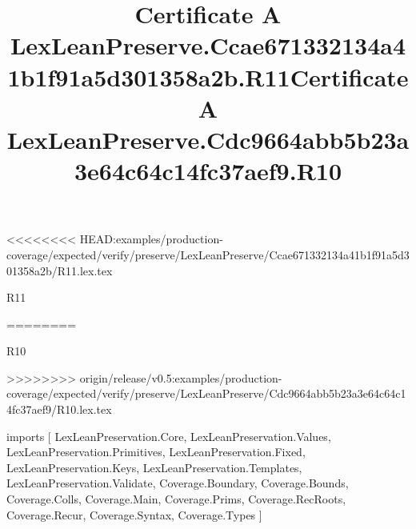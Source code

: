 <<<<<<<< HEAD:examples/production-coverage/expected/verify/preserve/LexLeanPreserve/Ccae671332134a41b1f91a5d301358a2b/R11.lex.tex
\begin{lexlean}{R11}
\title{Certificate A LexLeanPreserve.Ccae671332134a41b1f91a5d301358a2b.R11}
========
\begin{lexlean}{R10}
\title{Certificate A LexLeanPreserve.Cdc9664abb5b23a3e64c64c14fc37aef9.R10}
>>>>>>>> origin/release/v0.5:examples/production-coverage/expected/verify/preserve/LexLeanPreserve/Cdc9664abb5b23a3e64c64c14fc37aef9/R10.lex.tex
\begin{coremodule}
imports [
  LexLeanPreservation.Core,
  LexLeanPreservation.Values,
  LexLeanPreservation.Primitives,
  LexLeanPreservation.Fixed,
  LexLeanPreservation.Keys,
  LexLeanPreservation.Templates,
  LexLeanPreservation.Validate,
  Coverage.Boundary,
  Coverage.Bounds,
  Coverage.Colls,
  Coverage.Main,
  Coverage.Prims,
  Coverage.RecRoots,
  Coverage.Recur,
  Coverage.Syntax,
  Coverage.Types
]


\end{coremodule}
\end{lexlean}
\end{lexlean}
